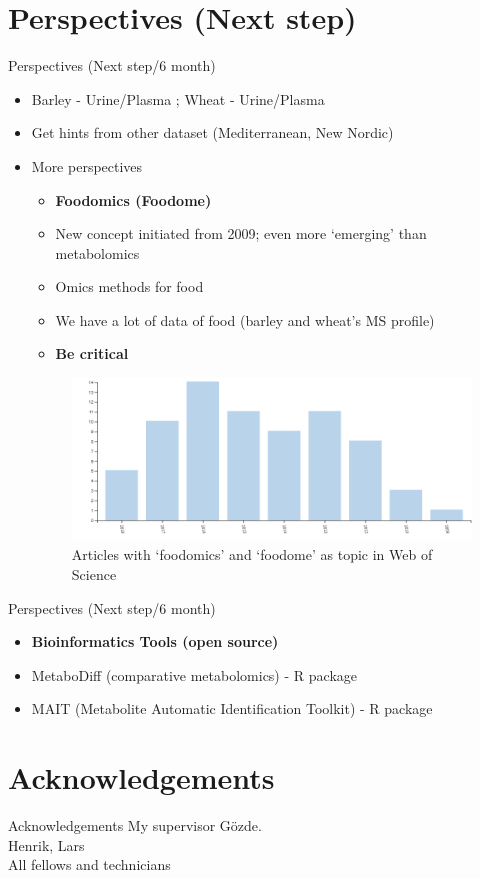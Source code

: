 \documentclass{beamer}
\begin{document}
\section{Perspectives (Next step)}
\begin{frame} {Perspectives (Next step/6 month)}

\begin{itemize}
\item \color{gray} Barley - Urine/\color{black}Plasma  ;  Wheat - Urine/Plasma
\item Get hints from other dataset (Mediterranean, New Nordic)
\item More perspectives
	\begin {itemize}
		\item \textbf{Foodomics (Foodome)}
		\item New concept initiated from 2009; even more `emerging' than metabolomics
		\item Omics methods for food 
		\item We have a lot of data of food (barley and wheat's MS profile)
		\item \textbf{Be critical}
	\end {itemize}
\begin{figure}[H]
    \centering
    \includegraphics[scale=0.27]{images/foodomics.jpg}
    \caption{Articles with `foodomics' and `foodome' as topic in Web of Science}
\end{figure}
\end{itemize}
\end{frame}
\begin{frame} {Perspectives (Next step/6 month)}

	\begin {itemize}
		\item \textbf{Bioinformatics Tools (open source)}
		\item MetaboDiff (comparative metabolomics) - R package
		\item MAIT (Metabolite Automatic Identification Toolkit) - R package
	\end {itemize}
\end{frame}



\section{Acknowledgements}
\begin{frame}{Acknowledgements}
My supervisor Gözde.\\ Henrik, Lars \\ All fellows and technicians\\
\end{frame}
\end{document}
